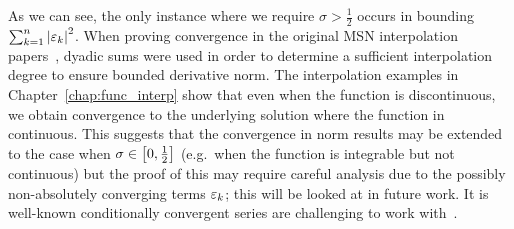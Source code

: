 As we can see, the only instance where we require $\sigma>\frac{1}{2}$
occurs in bounding $\sum_{k=1}^{n}\left| \varepsilon_{k} \right|^{2}$.
When proving convergence in the original MSN interpolation
papers~\cite{msnInterp,msnBirkhoff},
dyadic sums were used in order to determine a sufficient interpolation degree
to ensure bounded derivative norm.
The interpolation examples in Chapter~\ref{chap:func_interp}
show that even when the function is discontinuous, we obtain
convergence to the underlying solution where the function in continuous.
This suggests that the convergence in norm results may be extended
to the case when $\sigma\in\left[ 0,\frac{1}{2} \right]$ (e.g.~when
the function is integrable but not continuous) but the proof of this
may require careful analysis due to the possibly non-absolutely
converging terms $\varepsilon_{k}$; this will be looked at in future work.
It is well-known conditionally convergent series are challenging
to work with~\cite{baby_rudin,knopp_series}.
